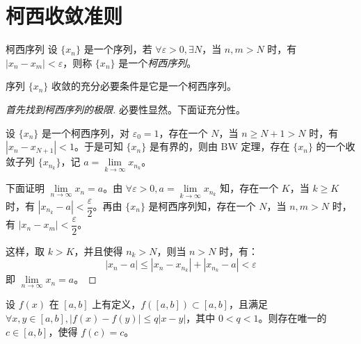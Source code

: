 
\section{柯西收敛准则}

\begin{definition}{柯西序列}
	设 $\{x_n\}$ 是一个序列，若 $\forall \varepsilon > 0, \exists N$，当 $n, m > N$ 时，有 $|x_n - x_m| < \varepsilon$，则称 $\{x_n\}$ 是一个\emph{柯西序列}。
\end{definition}

\begin{theorem}[柯西收敛准则]
	序列 $\{x_n\}$ 收敛的充分必要条件是它是一个柯西序列。
\end{theorem}

\begin{proof}[首先找到柯西序列的极限]
	必要性显然。下面证充分性。

	设 $\{x_n\}$ 是一个柯西序列，对 $\varepsilon_0 = 1$，存在一个 $N$，当 $n \ge N + 1 > N$ 时，有 $|x_n - x_{N + 1}| < 1$。于是可知 $\{x_n\}$ 是有界的，则由 BW 定理，存在 $\{x_n\}$ 的一个收敛子列 $\{x_{n_k}\}$，记 $a = \lim\limits_{k \rightarrow \infty} x_{n_k}$。

	下面证明 $\lim\limits_{n \rightarrow \infty} x_n = a$。由 $\forall \varepsilon > 0, a = \lim\limits_{k \rightarrow \infty} x_{n_k}$ 知，存在一个 $K$，当 $k \ge K$ 时，有 $|x_{n_k} - a| < \dfrac{\varepsilon}{2}$。再由 $\{x_n\}$ 是柯西序列知，存在一个 $N$，当 $n, m > N$ 时，有 $|x_n - x_m| < \dfrac{\varepsilon}{2}$。

	这样，取 $k > K$，并且使得 $n_k > N$，则当 $n > N$ 时，有：
	$$
	|x_n - a| \le |x_n - x_{n_k}| + |x_{n_k} - a| < \varepsilon
	$$
	即 $\lim\limits_{n \rightarrow \infty} x_n = a$。
\end{proof}

\begin{theorem}[压缩映照原理]
	设 $f(x)$ 在 $[a, b]$ 上有定义，$f([a, b]) \subset [a, b]$，且满足 $\forall x, y \in [a, b], |f(x) - f(y)| \le q |x - y|$，其中 $0 < q < 1$。则存在唯一的 $c \in [a, b]$，使得 $f(c) = c$。
\end{theorem}

